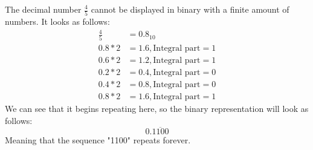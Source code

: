 The decimal number $\frac{4}{5}$ cannot be displayed in binary with a finite amount of numbers. It looks as follows:
\begin{align*}
\frac{4}{5} &= 0.8_{10}\\
0.8 * 2 &= 1.6, \text{Integral part} = 1 \\
0.6 * 2 &= 1.2, \text{Integral part} = 1 \\
0.2 * 2 &= 0.4, \text{Integral part} = 0 \\
0.4 * 2 &= 0.8, \text{Integral part} = 0 \\
0.8 * 2 &= 1.6, \text{Integral part} = 1
\end{align*}
We can see that it begins repeating here, so the binary representation will look as follows:
$$
0.\overline{1100}
$$
Meaning that the sequence "1100" repeats forever.
